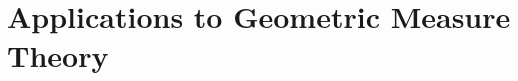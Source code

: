 \chapter[Effectivizing GMT]{Applications to Geometric Measure Theory}\label{chapter:effectivizing_GMT}





